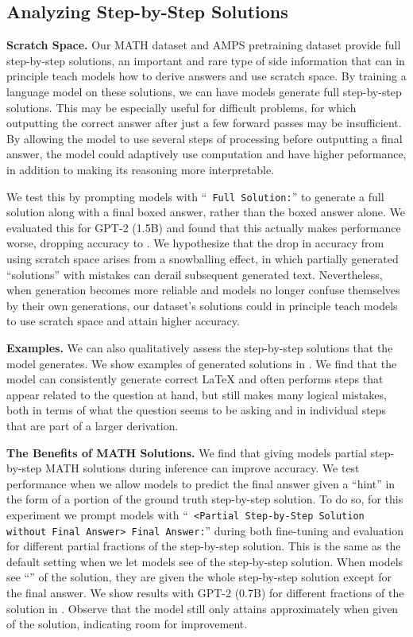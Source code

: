 \documentclass{article}
\begin{document}
\subsection{Analyzing Step-by-Step Solutions}

\textbf{Scratch Space.}\quad
Our MATH dataset and AMPS pretraining dataset provide full step-by-step solutions, an important and rare type of side information \citep{Murty2020ExpBERTRE} that can in principle teach models how to derive answers and use scratch space. By training a language model on these solutions, we can have models generate full step-by-step solutions. This may be especially useful for difficult problems, for which outputting the correct answer after just a few forward passes may be insufficient. By allowing the model to use several steps of processing before outputting a final answer, the model could adaptively use computation and have higher peformance, in addition to making its reasoning more interpretable.

We test this by prompting models with ``\texttt{ Full Solution:}'' to generate a full solution along with a final boxed answer, rather than the boxed answer alone. We evaluated this for GPT-2 (1.5B) and found that this actually makes performance worse, dropping accuracy to . We hypothesize that the drop in accuracy from using scratch space arises from a snowballing effect, in which partially generated ``solutions'' with mistakes can derail subsequent generated text. Nevertheless, when generation becomes more reliable and models no longer confuse themselves by their own generations, our dataset's solutions could in principle teach models to use scratch space and attain higher accuracy.

\textbf{Examples.}\quad
We can also qualitatively assess the step-by-step solutions that the model generates. We show examples of generated solutions in .
We find that the model can consistently generate correct \LaTeX{} and often performs steps that appear related to the question at hand, but still makes many logical mistakes, both in terms of what the question seems to be asking and in individual steps that are part of a larger derivation. 

\textbf{The Benefits of MATH Solutions.}\quad
We find that giving models partial step-by-step MATH solutions during inference can improve accuracy.
We test performance when we allow models to predict the final answer given a ``hint'' in the form of a portion of the ground truth step-by-step solution. 
To do so, for this experiment we prompt models with ``\texttt{ <Partial Step-by-Step Solution without Final Answer> Final Answer:}'' during both fine-tuning and evaluation for different partial fractions of the step-by-step solution. 
This is the same as the default setting when we let models see  of the step-by-step solution. 
When models see ``'' of the solution, they are given the whole step-by-step solution except for the final answer. 
We show results with GPT-2 (0.7B) for different fractions of the solution in . Observe that the model still only attains approximately  when given  of the solution, indicating room for improvement.
\end{document}
